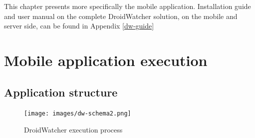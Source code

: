 This chapter presents more specifically the mobile application.
Installation guide and user manual on the complete DroidWatcher solution, on the mobile and server side, can be found in Appendix \ref{dw-guide}




\section{Mobile application execution}

\subsection{Application structure}
\label{sec:dw-app-structure}

\begin{figure}[h]
  \centering
  \texttt{[image: images/dw-schema2.png]}
  \caption{DroidWatcher execution process}
  \label{fig:dw-schema}
\end{figure}

